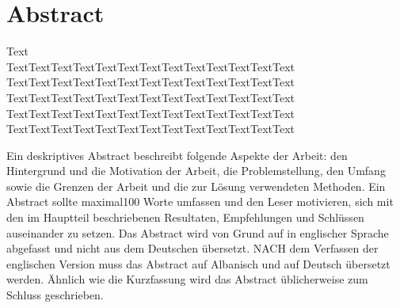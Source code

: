 %
%
\newpage

%
%
\section*{Abstract}
Text\\
TextTextTextTextTextTextTextTextTextTextTextTextText TextTextTextTextTextTextTextTextTextTextTextTextText TextTextTextTextTextTextTextTextTextTextTextTextText TextTextTextTextTextTextTextTextTextTextTextTextText TextTextTextTextTextTextTextTextTextTextTextTextText

\color{red} 
Ein deskriptives Abstract beschreibt folgende Aspekte der Arbeit: den Hintergrund und die Motivation der Arbeit, die Problemstellung, den Umfang sowie die Grenzen der Arbeit und die zur L\"osung verwendeten Methoden. Ein Abstract sollte maximal100 Worte umfassen und den Leser motivieren, sich mit den im Hauptteil beschriebenen Resultaten, Empfehlungen und Schl\"ussen auseinander zu setzen. Das Abstract wird von Grund auf in englischer Sprache abgefasst und nicht aus dem Deutschen \"ubersetzt. NACH dem Verfassen der englischen Version muss das Abstract auf Albanisch und auf Deutsch \"ubersetzt werden. \"Ahnlich wie die Kurzfassung wird das Abstract \"ublicherweise zum Schluss geschrieben.
\color{black} 
